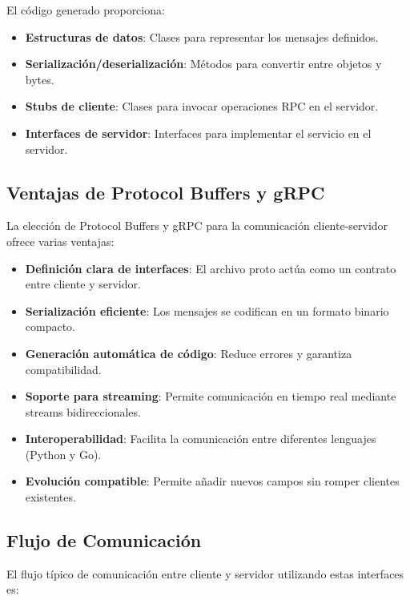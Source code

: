 \documentclass[12pt,letterpaper]{article}
\begin{document}
El código generado proporciona:

\begin{itemize}
    \item \textbf{Estructuras de datos}: Clases para representar los mensajes definidos.
    \item \textbf{Serialización/deserialización}: Métodos para convertir entre objetos y bytes.
    \item \textbf{Stubs de cliente}: Clases para invocar operaciones RPC en el servidor.
    \item \textbf{Interfaces de servidor}: Interfaces para implementar el servicio en el servidor.
\end{itemize}

\subsection{Ventajas de Protocol Buffers y gRPC}

La elección de Protocol Buffers y gRPC para la comunicación cliente-servidor ofrece varias ventajas:

\begin{itemize}
    \item \textbf{Definición clara de interfaces}: El archivo proto actúa como un contrato entre cliente y servidor.
    \item \textbf{Serialización eficiente}: Los mensajes se codifican en un formato binario compacto.
    \item \textbf{Generación automática de código}: Reduce errores y garantiza compatibilidad.
    \item \textbf{Soporte para streaming}: Permite comunicación en tiempo real mediante streams bidireccionales.
    \item \textbf{Interoperabilidad}: Facilita la comunicación entre diferentes lenguajes (Python y Go).
    \item \textbf{Evolución compatible}: Permite añadir nuevos campos sin romper clientes existentes.
\end{itemize}

\subsection{Flujo de Comunicación}

El flujo típico de comunicación entre cliente y servidor utilizando estas interfaces es:
\end{document}
